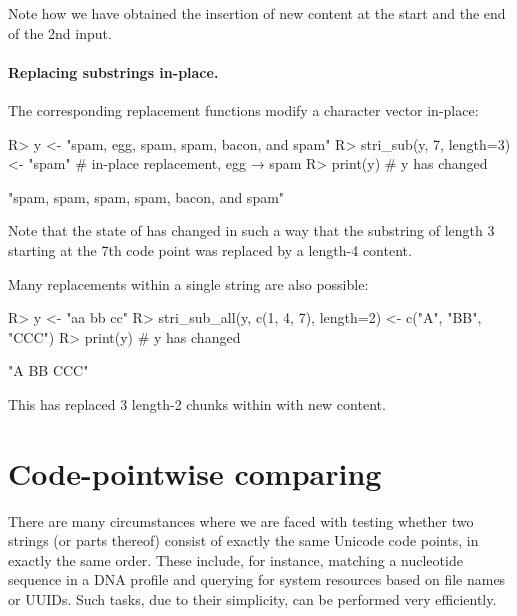\documentclass[nojss]{jss}
\begin{document}
\noindent
Note how we have obtained the insertion of new content
at the start and the end of the 2nd input.


\paragraph{Replacing substrings in-place.}
The corresponding {replacement functions} modify
a character vector in-place:

\begin{Schunk}
\begin{Sinput}
R> y <- "spam, egg, spam, spam, bacon, and spam"
R> stri_sub(y, 7, length=3) <- "spam"  # in-place replacement, egg → spam
R> print(y)                            # y has changed
\end{Sinput}
\begin{Soutput}
[1] "spam, spam, spam, spam, bacon, and spam"
\end{Soutput}
\end{Schunk}

Note that the state of  has changed in such a way that the
substring of length 3 starting at the 7th code point
was replaced by a length-4 content.

Many replacements within a single string are also possible:

\begin{Schunk}
\begin{Sinput}
R> y <- "aa bb cc"
R> stri_sub_all(y, c(1, 4, 7), length=2) <- c("A", "BB", "CCC")
R> print(y)                            # y has changed
\end{Sinput}
\begin{Soutput}
[1] "A BB CCC"
\end{Soutput}
\end{Schunk}

\noindent
This has replaced 3 length-2 chunks within  with new content.





\section{Code-pointwise comparing}\label{Sec:fixed}

There are many circumstances where we are faced with testing
whether two strings (or parts thereof)
consist  of exactly the same Unicode code points, in exactly the same order.
These include, for instance, matching a nucleotide sequence
in a DNA profile and querying for system resources based on file names or UUIDs.
Such tasks, due to their simplicity, can be performed very efficiently.
\end{document}
